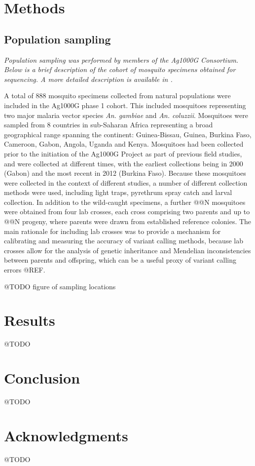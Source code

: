 \documentclass[a4paper,11pt,abstracton,hidelinks]{scrartcl}
\begin{document}
\section{Methods}


\subsection{Population sampling}


\textit{Population sampling was performed by members of the Ag1000G Consortium. Below is a brief description of the cohort of mosquito specimens obtained for sequencing. A more detailed description is available in \citet{Ag1000G2017}.}


A total of 888 mosquito specimens collected from natural populations were included in the Ag1000G phase 1 cohort. 
%
This included mosquitoes representing two major malaria vector species  \textit{An. gambiae} and \textit{An. coluzzii}.
%
Mosquitoes were sampled from 8 countries in sub-Saharan Africa representing a broad geographical range spanning the continent: Guinea-Bissau, Guinea, Burkina Faso, Cameroon, Gabon, Angola, Uganda and Kenya.
%
Mosquitoes had been collected prior to the initiation of the Ag1000G Project as part of previous field studies, and were collected at different times, with the earliest collections being in 2000 (Gabon) and the most recent in 2012 (Burkina Faso).
%
Because these mosquitoes were collected in the context of different studies, a number of different collection methods were used, including light traps, pyrethrum spray catch and larval collection.
%
In addition to the wild-caught specimens, a further @@N mosquitoes were obtained from four lab crosses, each cross comprising two parents and up to @@N progeny, where parents were drawn from established reference colonies.
%
The main rationale for including lab crosses was to provide a mechanism for calibrating and measuring the accuracy of variant calling methods, because lab crosses allow for the analysis of genetic inheritance and Mendelian inconsistencies between parents and offspring, which can be a useful proxy of variant calling errors @REF.


@TODO figure of sampling locations


\section{Results}


@TODO


\section{Conclusion}


@TODO


\section{Acknowledgments}


@TODO


\printbibliography
\end{document}
